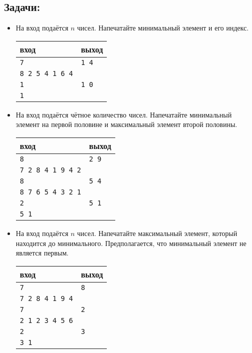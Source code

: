 \documentclass{article}
\begin{document}
\subsection*{Задачи:}
\begin{itemize}
\item На вход подаётся $n$ чисел. Напечатайте минимальный элемент и его индекс.
\begin{center}
\begin{tabular}{ l | l }
 вход & выход \\ \hline
 \texttt{7} & \texttt{1 4}  \\ 
 \texttt{8 2 5 4 1 6 4} &  \\ \hline
 \texttt{1} & \texttt{1 0}  \\ 
 \texttt{1} &  \\
\end{tabular}
\end{center}


\item На вход подаётся чётное количество чисел. Напечатайте минимальный элемент на первой половине и  максимальный элемент второй половины.
\begin{center}
\begin{tabular}{ l | l }
 вход & выход \\ \hline
 \texttt{8} & \texttt{2 9}  \\ 
 \texttt{7 2 8 4 1 9 4 2} &  \\ \hline
 \texttt{8} & \texttt{5 4}  \\ 
 \texttt{8 7 6 5 4 3 2 1} &   \\ \hline
 \texttt{2} & \texttt{5 1}  \\ 
 \texttt{5 1} &   \\
\end{tabular}
\end{center}


\item На вход подаётся $n$ чисел. Напечатайте максимальный элемент, который находится до минимального. Предполагается, что минимальный элемент не является первым.
\begin{center}
\begin{tabular}{ l | l }
 вход & выход \\ \hline
 \texttt{7} & \texttt{8}  \\ 
 \texttt{7 2 8 4 1 9 4} &  \\ \hline
 \texttt{7} & \texttt{2}  \\ 
 \texttt{2 1 2 3 4 5 6} &  \\ \hline
 \texttt{2} & \texttt{3}  \\ 
 \texttt{3 1} &  \\ \hline
\end{tabular}
\end{center}
\end{itemize}
\end{document}
